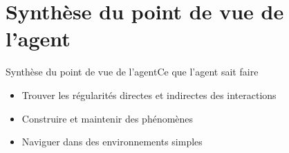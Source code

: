 \documentclass{beamer}
\begin{document}
%
%        

\section{Synthèse du point de vue de l'agent}
\begin{frame}{Synthèse du point de vue de l'agent}{Ce que l'agent sait faire}
\begin{itemize}
\item Trouver les régularités directes et indirectes des interactions
\item Construire et maintenir des phénomènes
\item Naviguer dans des environnements simples 
\end{itemize}
\end{frame}
\end{document}
